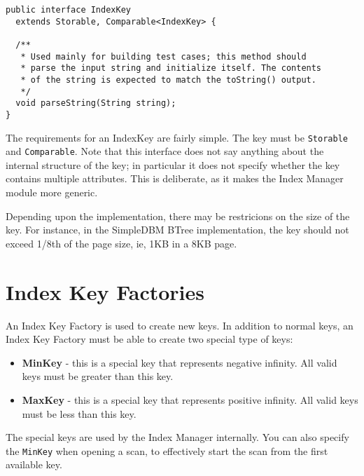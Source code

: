 \documentclass[a4paper,draft,oneside]{book}
\begin{document}
\begin{verbatim}
public interface IndexKey 
  extends Storable, Comparable<IndexKey> {
	
  /**
   * Used mainly for building test cases; this method should
   * parse the input string and initialize itself. The contents 
   * of the string is expected to match the toString() output.
   */
  void parseString(String string);
}
\end{verbatim}

The requirements for an IndexKey are fairly simple. The key must be
\verb|Storable| and \verb|Comparable|. Note that this interface does
not say anything about the internal structure of the key; in
particular it does not specify whether the key contains multiple
attributes. This is deliberate, as it makes the Index Manager module
more generic.

Depending upon the implementation, there may be restricions on the
size of the key. For instance, in the SimpleDBM BTree implementation,
the key should not exceed 1/8th of the page size, ie, 1KB in a 8KB
page.

\section{Index Key Factories}

An Index Key Factory is used to create new keys. In addition to normal
keys, an Index Key Factory must be able to create two special type of
keys:

\begin{itemize}
\item \textbf{MinKey} - this is a special key that represents negative
  infinity. All valid keys must be greater than this key.
\item \textbf{MaxKey} - this is a special key that represents positive
  infinity. All valid keys must be less than this key.
\end{itemize}

The special keys are used by the Index Manager internally. You can
also specify the \verb|MinKey| when opening a scan, to effectively
start the scan from the first available key.
\end{document}
